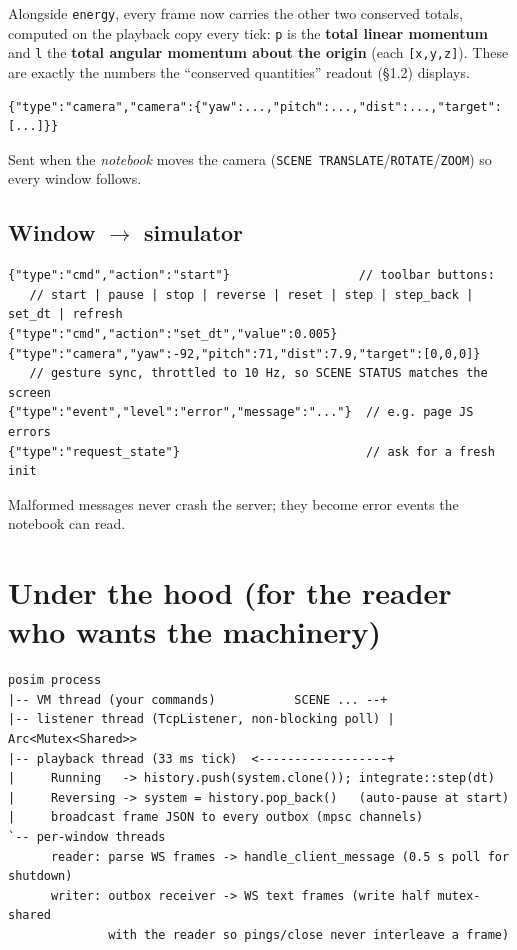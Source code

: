 \documentclass[11pt]{article}
\newcommand{\kw}[1]{\texttt{\uppercase{#1}}}
\newcommand{\code}[1]{\texttt{#1}}
\begin{document}
Alongside \code{energy}, every frame now carries the other two
conserved totals, computed on the playback copy every tick: \code{p}
is the \textbf{total linear momentum} and \code{l} the \textbf{total
angular momentum about the origin} (each \code{[x,y,z]}). These are
exactly the numbers the ``conserved quantities'' readout (\S1.2)
displays.

\begin{lstlisting}
{"type":"camera","camera":{"yaw":...,"pitch":...,"dist":...,"target":[...]}}
\end{lstlisting}
Sent when the \emph{notebook} moves the camera
(\kw{scene translate}/\kw{rotate}/\kw{zoom}) so every window follows.

\subsection{Window $\to$ simulator}

\begin{lstlisting}
{"type":"cmd","action":"start"}                  // toolbar buttons:
   // start | pause | stop | reverse | reset | step | step_back | set_dt | refresh
{"type":"cmd","action":"set_dt","value":0.005}
{"type":"camera","yaw":-92,"pitch":71,"dist":7.9,"target":[0,0,0]}
   // gesture sync, throttled to 10 Hz, so SCENE STATUS matches the screen
{"type":"event","level":"error","message":"..."}  // e.g. page JS errors
{"type":"request_state"}                          // ask for a fresh init
\end{lstlisting}

Malformed messages never crash the server; they become error events
the notebook can read.

\section{Under the hood (for the reader who wants the machinery)}

\begin{lstlisting}
posim process
|-- VM thread (your commands)           SCENE ... --+
|-- listener thread (TcpListener, non-blocking poll) | Arc<Mutex<Shared>>
|-- playback thread (33 ms tick)  <------------------+
|     Running   -> history.push(system.clone()); integrate::step(dt)
|     Reversing -> system = history.pop_back()   (auto-pause at start)
|     broadcast frame JSON to every outbox (mpsc channels)
`-- per-window threads
      reader: parse WS frames -> handle_client_message (0.5 s poll for shutdown)
      writer: outbox receiver -> WS text frames (write half mutex-shared
              with the reader so pings/close never interleave a frame)
\end{lstlisting}
\end{document}
